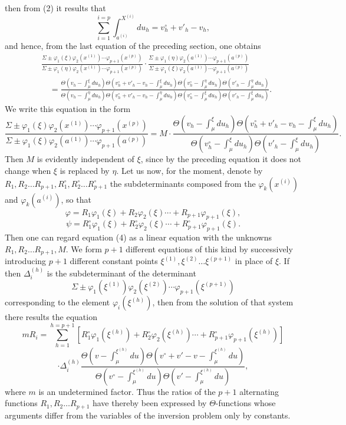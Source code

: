 \documentclass[10pt]{article}
\begin{document}
then from (2) it results that
\[
\sum_{i=1}^{i=p}\int_{a^{(i)}}^{X^{(i)}}du_h=v_h^\circ+v'_h-v_h,
\]
and hence, from the last equation of the preceding section, one obtains
\[
\tag{3}
\begin{aligned}
&\frac{\Sigma\pm\varphi_1(\xi)\varphi_2(x^{(1)})\cdots\varphi_{p+1}(x^{(p)})}
{\Sigma\pm\varphi_1(\eta)\varphi_2(x^{(1)})\cdots\varphi_{p+1}(x^{(p)})}
\cdot
\frac{\Sigma\pm\varphi_1(\eta)\varphi_2(a^{(1)})\cdots\varphi_{p+1}(a^{(p)})}
{\Sigma\pm\varphi_1(\xi)\varphi_2(a^{(1)})\cdots\varphi_{p+1}(a^{(p)})}\\
&\quad=
\frac{
\Theta\!\left(v_h-\int_{\mu}^{\xi}du_h\right)
\Theta\!\left(v_h^\circ+v'_h-v_h-\int_{\mu}^{\xi}du_h\right)
\Theta\!\left(v_h^\circ-\int_{\mu}^{\eta}du_h\right)
\Theta\!\left(v'_h-\int_{\mu}^{\eta}du_h\right)}
{\Theta\!\left(v_h-\int_{\mu}^{\eta}du_h\right)
\Theta\!\left(v_h^\circ+v'_h-v_h-\int_{\mu}^{\eta}du_h\right)
\Theta\!\left(v_h^\circ-\int_{\mu}^{\xi}du_h\right)
\Theta\!\left(v'_h-\int_{\mu}^{\xi}du_h\right)}.
\end{aligned}
\]
We write this equation in the form
\[
\tag{4}
\frac{\Sigma\pm\varphi_1(\xi)\varphi_2(x^{(1)})\cdots\varphi_{p+1}(x^{(p)})}
{\Sigma\pm\varphi_1(\xi)\varphi_2(a^{(1)})\cdots\varphi_{p+1}(a^{(p)})}
=
M\cdot
\frac{
\Theta\!\left(v_h-\int_{\mu}^{\xi}du_h\right)
\Theta\!\left(v_h^\circ+v'_h-v_h-\int_{\mu}^{\xi}du_h\right)}
{\Theta\!\left(v_h^\circ-\int_{\mu}^{\xi}du_h\right)
\Theta\!\left(v'_h-\int_{\mu}^{\xi}du_h\right)}.
\]
Then \(M\) is evidently independent of \(\xi\), since by the preceding equation it does not change when \(\xi\) is replaced by \(\eta\). Let us now, for the moment, denote by \(R_1,R_2\ldots R_{p+1},R_1^\circ,R_2^\circ\ldots R_{p+1}^\circ\) the subdeterminants composed from the \(\varphi_k(x^{(i)})\) and \(\varphi_k(a^{(i)})\), so that
\[
\varphi=R_1\varphi_1(\xi)+R_2\varphi_2(\xi)\cdots+R_{p+1}\varphi_{p+1}(\xi),
\]
\[
\psi=R_1^\circ\varphi_1(\xi)+R_2^\circ\varphi_2(\xi)\cdots+R_{p+1}^\circ\varphi_{p+1}(\xi).
\]
Then one can regard equation (4) as a linear equation with the unknowns \(R_1,R_2\ldots R_{p+1},M\). We form \(p+1\) different equations of this kind by successively introducing \(p+1\) different constant points \(\xi^{(1)},\xi^{(2)}\ldots\xi^{(p+1)}\) in place of \(\xi\). If then \(\Delta_i^{(h)}\) is the subdeterminant of the determinant
\[
\Sigma\pm\varphi_1(\xi^{(1)})\varphi_2(\xi^{(2)})\cdots\varphi_{p+1}(\xi^{(p+1)})
\]
corresponding to the element \(\varphi_i(\xi^{(h)})\), then from the solution of that system there results the equation
\[
mR_i=
\sum_{h=1}^{h=p+1}
\left[R_1^\circ\varphi_1(\xi^{(h)})+R_2^\circ\varphi_2(\xi^{(h)})\cdots+
R_{p+1}^\circ\varphi_{p+1}(\xi^{(h)})\right]
\]
\[
\cdot\Delta_i^{(h)}
\frac{
\Theta\!\left(v-\int_{\mu}^{\xi^{(h)}}du\right)
\Theta\!\left(v^\circ+v'-v-\int_{\mu}^{\xi^{(h)}}du\right)}
{\Theta\!\left(v^\circ-\int_{\mu}^{\xi^{(h)}}du\right)
\Theta\!\left(v'-\int_{\mu}^{\xi^{(h)}}du\right)},
\]
where \(m\) is an undetermined factor. Thus the ratios of the \(p+1\) alternating functions \(R_1,R_2\ldots R_{p+1}\) have thereby been expressed by \(\Theta\)-functions whose arguments differ from the variables of the inversion problem only by constants.
\clearpage
\end{document}
